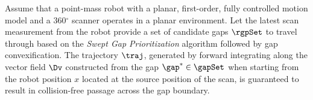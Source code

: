 \begin{theorem} \label{theTheorem}
  Assume that a point-mass robot with a planar, first-order, fully controlled
  motion model and a 360$^\circ$ scanner operates in a planar environment.
  Let the latest scan measurement from the robot provide a set of
  candidate gaps $\rgpSet$ to travel through based on the {\em Swept Gap
  Prioritization} algorithm followed by gap convexification.  The
  trajectory $\traj$, generated by forward integrating along the vector
  field $\Dv$ constructed from the gap $\gap^* \in \gapSet$ when starting 
  from the robot position $x$ located at the source position of the
  scan, is guaranteed to result in collision-free passage across the gap
  boundary.
\end{theorem}

